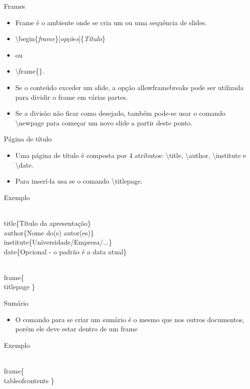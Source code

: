 \begin{frame}[fragile]{Frames}
    \begin{itemize}
    \item Frame é o ambiente onde se cria um ou uma sequência de slides.
    \item[] \alert{\textbackslash begin\{\textit{frame}\}[\textit{opções}]\{\textit{Título}\}}
    \item[] ou
    \item[] \alert{\textbackslash frame\{\}}.
    \item Se o conteúdo exceder um slide, a opção \alert{allowframebreaks} pode ser utilizada para dividir o frame em várias partes.
    \item Se a divisão não ficar como desejado, também pode-se usar o comando \alert{\textbackslash newpage} para começar um novo slide a partir deste ponto.
    \end{itemize}
\end{frame}

\begin{frame}[fragile]{Página de título}
    \begin{itemize}
    \item Uma página de título é composta por 4 atributos: \alert{\textbackslash title}, \alert{\textbackslash author}, \alert{\textbackslash institute} e \alert{\textbackslash date}.
    \item Para inserí-la usa se o comando \alert{\textbackslash titlepage}.
    \end{itemize}

    \begin{exampleblock}{Exemplo}
    \begin{semiverbatim}
\\title\{Título da apresentação\}
\\author\{Nome do(s) autor(es)\}
\\institute\{Universidade/Empresa/...\}
\\date\{Opcional - o padrão é a data atual\}

\\frame\{
    \\titlepage
    \}
    \end{semiverbatim}
    \end{exampleblock}
\end{frame}

\begin{frame}[fragile]{Sumário}
    \begin{itemize}
    \item O comando para se criar um sumário é o mesmo que nos outros documentos, porém ele deve estar dentro de um frame
    \end{itemize}

    \begin{exampleblock}{Exemplo}
    \begin{semiverbatim}
\\frame\{
    \alert{\\tableofcontents}
    \}
    \end{semiverbatim}
    \end{exampleblock}
\end{frame}

